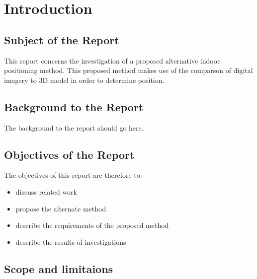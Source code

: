 \section{Introduction}
\subsection{Subject of the Report}
This report concerns the investigation of a proposed alternative indoor positioning method. This proposed method makes use of the comparson of digital imagery to 3D model in order to determine position.

\subsection{Background to the Report}
The background to the report should go here.


\subsection{Objectives of the Report}
The objectives of this report are therefore to:
\begin{itemize}
	\item discuss related work
	\item propose the alternate method
	\item describe the requirements of the proposed method
	\item describe the results of investigations
\end{itemize}

\subsection{Scope and limitaions}

